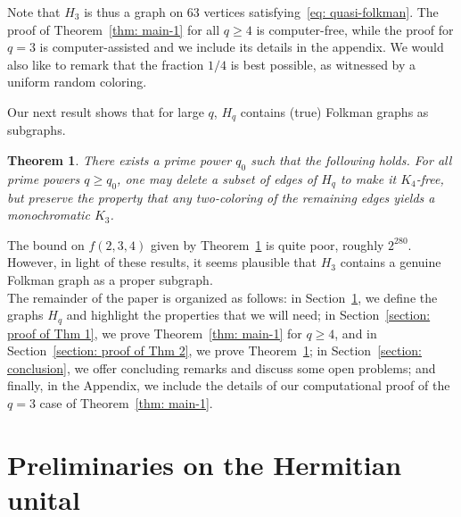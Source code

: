 \documentclass[A4paper,reqno,oneside,12pt]{amsart}
\theoremstyle{plain}
\newtheorem{theorem}{Theorem}[section]
\theoremstyle{definition}
\begin{document}
Note that $H_3$ is thus a graph on $63$ vertices satisfying~\eqref{eq: quasi-folkman}.
The proof of Theorem~\ref{thm: main-1} for all $q \geq 4$ is computer-free, while the proof for $q=3$ is computer-assisted and we include its details in the appendix.
We would also like to remark that the fraction $1/4$ is best possible, as witnessed by a uniform random coloring.

Our next result shows that for large $q$, $H_q$ contains (true) Folkman graphs as subgraphs.

\begin{theorem}
\label{thm: main-2}
    There exists a prime power $q_0$ such that the following holds.
    For all prime powers $q \geq q_0$, one may delete a subset of edges of $H_q$ to make it $K_4$-free, but preserve the property that any two-coloring of the remaining edges yields a monochromatic $K_3$. 
\end{theorem}

\noindent The bound on $f(2,3,4)$ given by Theorem~\ref{thm: main-2} is quite poor, roughly $2^{280}$.
However, in light of these results, it seems plausible that $H_3$ contains a genuine Folkman graph as a proper subgraph.\\

The remainder of the paper is organized as follows: 
in Section~\ref{section: unital}, we define the graphs $H_q$ and highlight the properties that we will need;
in Section~\ref{section: proof of Thm 1}, we prove Theorem~\ref{thm: main-1} for $q \geq 4$, and in Section~\ref{section: proof of Thm 2}, we prove Theorem~\ref{thm: main-2}; in Section~\ref{section: conclusion}, we offer concluding remarks and discuss some open problems; and finally, in the Appendix, we include the details of our computational proof of the $q=3$ case of Theorem~\ref{thm: main-1}.


\section{Preliminaries on the Hermitian unital}
\label{section: unital}
\end{document}
